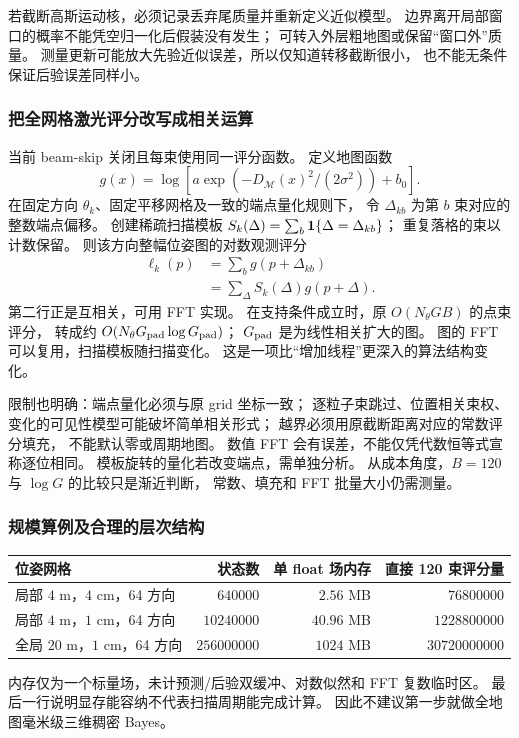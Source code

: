 若截断高斯运动核，必须记录丢弃尾质量并重新定义近似模型。
边界离开局部窗口的概率不能凭空归一化后假装没有发生；
可转入外层粗地图或保留“窗口外”质量。
测量更新可能放大先验近似误差，所以仅知道转移截断很小，
也不能无条件保证后验误差同样小。

\subsubsection{把全网格激光评分改写成相关运算}
当前 beam-skip 关闭且每束使用同一评分函数。
定义地图函数
\[
g(x)=\log\left[a\exp(-D_{\mathcal M}(x)^2/(2\sigma^2))+b_0\right].
\]
在固定方向 $\theta_k$、固定平移网格及一致的端点量化规则下，
令 $\Delta_{kb}$ 为第 $b$ 束对应的整数端点偏移。
创建稀疏扫描模板
$S_k(\Delta)=\sum_b\mathbf1\{\Delta=\Delta_{kb}\}$；
重复落格的束以计数保留。
则该方向整幅位姿图的对数观测评分
\begin{align}
\ell_k(p)
&=\sum_bg(p+\Delta_{kb})\\
&=\sum_\Delta S_k(\Delta)g(p+\Delta).
\label{eq:senscorr}
\end{align}
第二行正是互相关，可用 FFT 实现。
在支持条件成立时，原 $O(N_\theta GB)$ 的点束评分，
转成约 $O(N_\theta G_{\rm pad}\log G_{\rm pad})$；
$G_{\rm pad}$ 是为线性相关扩大的图。
图的 FFT 可以复用，扫描模板随扫描变化。
这是一项比“增加线程”更深入的算法结构变化。

限制也明确：端点量化必须与原 grid 坐标一致；
逐粒子束跳过、位置相关束权、变化的可见性模型可能破坏简单相关形式；
越界必须用原截断距离对应的常数评分填充，
不能默认零或周期地图。
数值 FFT 会有误差，不能仅凭代数恒等式宣称逐位相同。
模板旋转的量化若改变端点，需单独分析。
从成本角度，$B=120$ 与 $\log G$ 的比较只是渐近判断，
常数、填充和 FFT 批量大小仍需测量。

\subsubsection{规模算例及合理的层次结构}
\begin{center}\small
\begin{tabular}{lrrr}
\toprule 位姿网格 & 状态数 & 单 float 场内存 & 直接 120 束评分量\\\midrule
局部 $4$ m，$4$ cm，64 方向 & $640000$ & $2.56$ MB & $76800000$\\
局部 $4$ m，$1$ cm，64 方向 & $10240000$ & $40.96$ MB & $1228800000$\\
全局 $20$ m，$1$ cm，64 方向 & $256000000$ & $1024$ MB & $30720000000$\\
\bottomrule
\end{tabular}
\end{center}
内存仅为一个标量场，未计预测/后验双缓冲、对数似然和 FFT 复数临时区。
最后一行说明显存能容纳不代表扫描周期能完成计算。
因此不建议第一步就做全地图毫米级三维稠密 Bayes。

